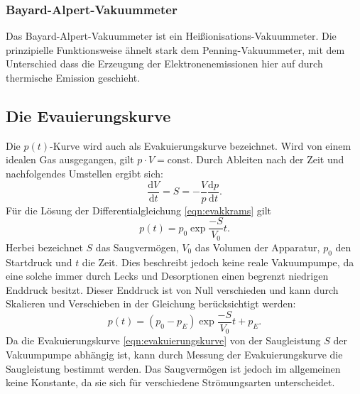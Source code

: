 \subsubsection*{Bayard-Alpert-Vakuummeter}
Das Bayard-Alpert-Vakuummeter ist ein Heißionisations-Vakuummeter. Die prinzipielle Funktionsweise ähnelt
stark dem Penning-Vakuummeter, mit dem Unterschied dass die Erzeugung der Elektronenemissionen hier auf durch
thermische Emission geschieht.

\subsection{Die Evauierungskurve}
\label{subsec:evakutheorie}
Die $p(t)$-Kurve wird auch als Evakuierungskurve bezeichnet. Wird von einem idealen Gas ausgegangen,
gilt $p \cdot V = \text{const}$. Durch Ableiten nach der Zeit und nachfolgendes Umstellen ergibt sich:
\begin{equation}
 \frac{\text{d}V}{\text{d}t} = S = - \frac{V}{p} \frac{\text{d}p}{\text{d}t}.
 \label{eqn:evakkrams}
\end{equation}
Für die Lösung der Differentialgleichung \ref{eqn:evakkrams} gilt
\begin{equation}
 p(t) = p_{0} \exp{\frac{-S}{V_{0}}t}.
\end{equation}
Herbei bezeichnet $S$ das Saugvermögen, $V_{0}$ das Volumen der Apparatur, $p_{0}$ den Startdruck und
$t$ die Zeit. Dies beschreibt jedoch keine reale Vakuumpumpe, da eine solche immer durch Lecks und Desorptionen
einen begrenzt niedrigen Enddruck besitzt. Dieser Enddruck ist von Null verschieden und kann durch Skalieren
und Verschieben in der Gleichung berücksichtigt werden:
\begin{equation}
 p(t) = (p_{0} - p_{E}) \exp{\frac{-S}{V_{0}}t} + p_{E}.
 \label{eqn:evakuierungskurve}
\end{equation}
Da die Evakuierungskurve \ref{eqn:evakuierungskurve} von der Saugleistung $S$ der Vakuumpumpe abhängig ist,
kann durch Messung der Evakuierungskurve die Saugleistung bestimmt werden. Das Saugvermögen ist jedoch
im allgemeinen keine Konstante, da sie sich für verschiedene Strömungsarten unterscheidet.

